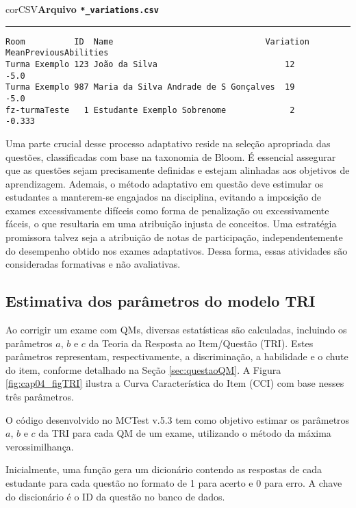 \begin{myboxCode}{corCSV}{\textbf{Arquivo \texttt{*\_variations.csv}}}\vspace{3mm}
\hrule
\begin{verbatim}
Room          ID  Name                               Variation  MeanPreviousAbilities
Turma Exemplo 123 João da Silva                          12        -5.0
Turma Exemplo 987 Maria da Silva Andrade de S Gonçalves  19        -5.0
fz-turmaTeste   1 Estudante Exemplo Sobrenome             2        -0.333
\end{verbatim}
\end{myboxCode}


Uma parte crucial desse processo adaptativo reside na seleção apropriada das questões, classificadas com base na taxonomia de Bloom. É essencial assegurar que as questões sejam precisamente definidas e estejam alinhadas aos objetivos de aprendizagem. Ademais, o método adaptativo em questão deve estimular os estudantes a manterem-se engajados na disciplina, evitando a imposição de exames excessivamente difíceis como forma de penalização ou excessivamente fáceis, o que resultaria em uma atribuição injusta de conceitos. Uma estratégia promissora talvez seja a atribuição de notas de participação, independentemente do desempenho obtido nos exames adaptativos. Dessa forma, essas atividades são consideradas formativas e não avaliativas.

\subsection{Estimativa dos parâmetros do modelo TRI}\label{sec:estimativas_TRI}

Ao corrigir um exame com QMs, diversas estatísticas são calculadas, incluindo os parâmetros $a$, $b$ e $c$ da Teoria da Resposta ao Item/Questão (TRI). Estes parâmetros representam, respectivamente, a discriminação, a habilidade e o chute do item, conforme detalhado na Seção \ref{sec:questaoQM}. A Figura \ref{fig:cap04_figTRI} ilustra a Curva Característica do Item (CCI) com base nesses três parâmetros.

O código desenvolvido no MCTest v.5.3 tem como objetivo estimar os parâmetros $a$, $b$ e $c$ da TRI para cada QM de um exame, utilizando o método da máxima verossimilhança.

Inicialmente, uma função gera um dicionário contendo as respostas de cada estudante para cada questão no formato de 1 para acerto e 0 para erro. A chave do discionário é o ID da questão no banco de dados.

